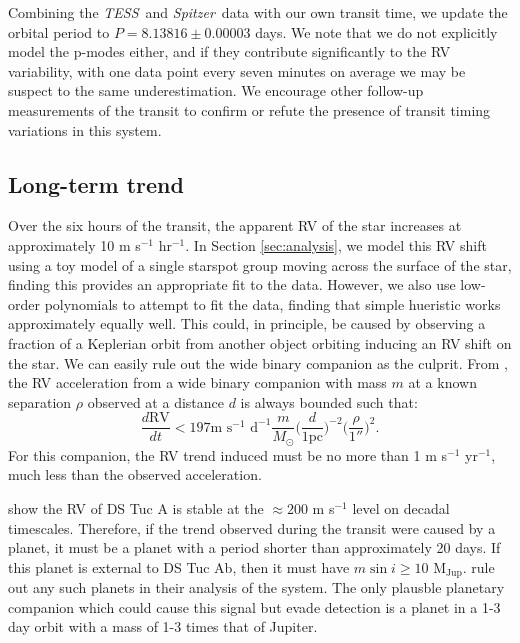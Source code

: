 \documentclass[twocolumn]{aastex63}
\newcommand{\tess}{{\it TESS}}
\newcommand{\spitz}{{\it Spitzer}}
\newcommand{\mjup}{{M$_\textrm{Jup}$}}
\begin{document}
Combining the \tess\ and \spitz\ data with our own transit time, we update the orbital period to $P= 8.13816 \pm 0.00003$ days. 
We note that we do not explicitly model the p-modes either, and if they contribute significantly to the RV variability, with one data point every seven minutes on average we may be suspect to the same underestimation.
We encourage other follow-up measurements of the transit to confirm or refute the presence of transit timing variations in this system.


\subsection{Long-term trend}

Over the six hours of the transit, the apparent RV of the star increases at approximately 10 m s$^{-1}$ hr$^{-1}$. 
In Section \ref{sec:analysis}, we model this RV shift using a toy model of a single 
starspot group moving across the surface of the star, finding this provides an appropriate fit to the data. 
However, we also use low-order polynomials to attempt to fit the data, finding that simple hueristic works approximately equally well.
This could, in principle, be caused by observing a fraction of a Keplerian orbit from another object orbiting inducing an RV shift on the star. 
We can easily rule out the wide binary companion as the culprit.
From \citet{Liu02}, the RV acceleration from a wide binary companion with mass $m$ at a known separation $\rho$ observed at a distance $d$ is always bounded such that:
\begin{equation}
    \frac{d\textrm{RV}}{dt} < 197 \textrm{m } \textrm{s}^{-1} \textrm{ d}^{-1}
    \frac{m}{M_\odot} \bigg(\frac{d}{1\textrm{pc}}\bigg)^{-2} \bigg(\frac{\rho}{1''}\bigg)^{2}.
\end{equation}
For this companion, the RV trend induced must be no more than 1 m s$^{-1}$ yr$^{-1}$, much less than the observed acceleration.

\citet{Benatti19} show the RV of DS Tuc A is stable at the $\approx 200$ m s$^{-1}$ level on decadal timescales. 
Therefore, if the trend observed during the transit were caused by a planet, it must be a planet with a period shorter than approximately 20 days. 
If this planet is external to DS Tuc Ab, then it must have $m \sin i \geq 10$ \mjup. 
\citet{Benatti19} rule out any such planets in their analysis of the system.
The only plausble planetary companion which could cause this signal but evade detection is a planet in a 1-3 day orbit with a mass of 1-3 times that of Jupiter. 
\end{document}
